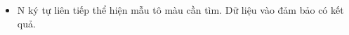 \begin{itemize}
	\item N ký tự liên tiếp thể hiện mẫu tô màu cần tìm. Dữ liệu vào đảm bảo có kết quả.
\end{itemize}